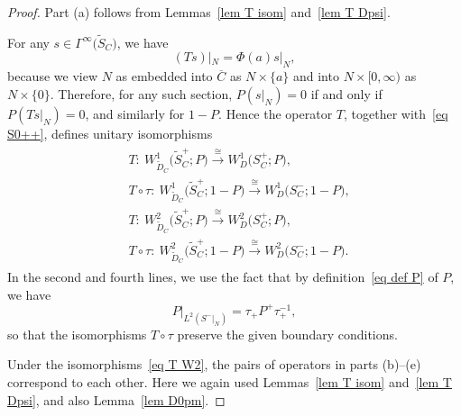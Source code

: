 \documentclass[10pt,a4paper]{article}
\numberwithin{equation}{section}
\begin{document}
\begin{proof}
Part (a) follows from Lemmas~\ref{lem T isom} and~\ref{lem T Dpsi}.

For any $s \in \Gamma^{\infty}\big(\widetilde{S}_C\big)$, we have
\[
(Ts)|_N = \Phi(a) s|_N,
\]
because we view $N$ as embedded into $\overline{C}$ as $N\times \{a\}$ and into $N \times [0,\infty)$ as $N \times \{0\}$. Therefore, for any such section, $P(s|_N) = 0$ if and only if $P (Ts|_N) = 0$, and similarly for $1-P$. Hence the operator $T$, together with~\eqref{eq S0++}, defines unitary isomorphisms
\begin{align}\label{eq T W2}
\begin{split}
&T\colon\ W^1_{\widetilde{D}_C}\big(\widetilde{S}_C^+; P\big) \xrightarrow{\cong} W^1_{D}\big(S_C^+; P\big), \\
&T \circ \tau \colon\ W^1_{\widetilde{D}_C}\big(\widetilde{S}_C^+;1- P\big) \xrightarrow{\cong}W^1_{D}\big(S_C^-;1- P\big), \\
&T\colon\ W^2_{\widetilde{D}_C}\big(\widetilde{S}_C^+; P\big) \xrightarrow{\cong}W^2_{D}\big(S_C^+; P\big),\\
&T\circ \tau \colon\ W^2_{\widetilde{D}_C}\big(\widetilde{S}_C^+; 1-P\big) \xrightarrow{\cong}W^2_{D}\big(S_C^-; 1-P\big).
\end{split}
\end{align}
In the second and fourth lines, we use the fact that by definition~\eqref{eq def P} of $P$, we have
\[
P|_{L^2(S^-|_N)} = \tau_+ P^+ \tau_+^{-1},
\]
so that the isomorphisms $T \circ \tau$ preserve the given boundary conditions.

Under the isomorphisms~\eqref{eq T W2}, the pairs of operators in parts (b)--(e) correspond to each other. Here we again used Lemmas~\ref{lem T isom} and~\ref{lem T Dpsi}, and also Lemma~\ref{lem D0pm}.
\end{proof}
\end{document}
